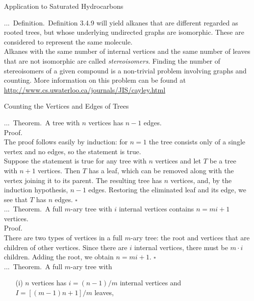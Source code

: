 \documentclass[smaller,hyperref={CJKbookmarks=true}]{beamer}
\newenvironment{PROOF}{{\noindent\!\sf\alert{Proof.}}\\}{\hfill$\square$\\}
\newcounter{zhuo}[subsection]
\renewcommand{\thezhuo}{\thesection.\thesubsection.\arabic{zhuo}}
\newenvironment{DEFINITION}{\stepcounter{zhuo}\alert{\thezhuo.~Definition.\,}}{}
\newenvironment{THEOREM}{\stepcounter{zhuo}\alert{\thezhuo.~Theorem.\,}}{}
\begin{document}
\begin{frame}{Application to Saturated Hydrocarbons}
\begin{spacing}{1}
\begin{DEFINITION}
Definition 3.4.9 will yield alkanes that are different regarded as rooted
trees, but whose underlying undirected graphs are isomorphic. These are
considered to represent the same molecule.\\[5pt]
Alkanes with the same number of internal vertices and the same number
of leaves that are not isomorphic are called \emph{stereoisomers}. Finding the
number of stereoisomers of a given compound is a non-trivial problem
involving graphs and counting. More information on this problem can be
found at \url{http://www.cs.uwaterloo.ca/journals/JIS/cayley.html}
\end{DEFINITION}
\end{spacing}
\end{frame}
\begin{frame}{Counting the Vertices and Edges of Trees}
\begin{spacing}{1.05}
\vspace*{9pt}
\begin{THEOREM}
A tree with $n$ vertices has $n-1$ edges.\\[7pt]
\end{THEOREM}
\begin{PROOF}
The proof follows easily by induction: for $n = 1$ the tree consists only of a
single vertex and no edges, so the statement is true.\\[7pt]
Suppose the statement is true for any tree with $n$ vertices and let $T$ be a
tree with $n + 1$ vertices. Then $T$ has a leaf, which can be removed along
with the vertex joining it to its parent. The resulting tree has $n$ vertices, and, by the induction hypothesis, $n - 1$ edges. Restoring the eliminated leaf and its edge, we see that $T$ has $n$ edges.
\end{PROOF}
\newpage
\begin{THEOREM}
A full $m$-ary tree with $i$ internal vertices contains $n=mi+1$ vertices.\\[7pt]
\begin{PROOF}
There are two types of vertices in a full $m$-ary tree: the root and vertices
that are children of other vertices. Since there are $i$ internal vertices, there
must be $m\cdot i$ children. Adding the root, we obtain $n=mi+1$.
\end{PROOF}
\begin{THEOREM}
A full $m$-ary tree with
\begin{itemize}
  \item[(i)] $n$ vertices has $i=(n-1)/m$ internal vertices and $I=[(m-1)n+1]/m$ leaves,

\end{itemize}
\end{THEOREM}
\end{THEOREM}
\end{spacing}
\end{frame}
\end{document}
